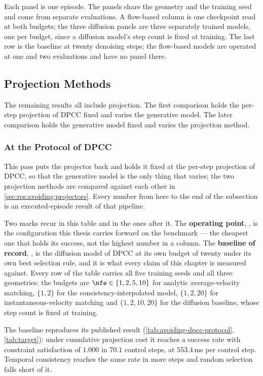 Each panel is one episode. The panels share the geometry and the training seed and come from separate
evaluations. A flow-based column is one checkpoint read at both budgets; the three diffusion panels are
three separately trained models, one per budget, since a diffusion model's step count is fixed at
training. The last row is the baseline at twenty denoising steps; the flow-based models are operated at
one and two evaluations and have no panel there.

\subsection{Projection Methods}\label{sec:res:avoiding:projection}

The remaining results all include projection. The first comparison holds the per-step projection of
\ac{DPCC} fixed and varies the generative model. The later comparison holds the generative model fixed
and varies the projection method.

\subsubsection{At the Protocol of DPCC}\label{sec:res:avoiding:dpccprotocol}\label{sec:res:fewstep}

This pass puts the projector back and holds it fixed at the per-step projection of \ac{DPCC}, so that
the generative model is the only thing that varies; the two projection methods are compared against
each other in \autoref{sec:res:avoiding:projectors}. Every number from here to the end of the
subsection is an executed-episode result of that pipeline.

Two marks recur in this table and in the ones after it. The \textbf{operating point}, \selectedmark, is
the configuration this thesis carries forward on the benchmark --- the cheapest one that holds its
success, not the highest number in a column. The \textbf{baseline of record}, \baselinemark, is the
diffusion model of \ac{DPCC} at its own budget of twenty under its own best selection rule, and it is
what every claim of this chapter is measured against. Every row of the table carries all five training
seeds and all three geometries: the budgets are $\nfe\in\{1,2,5,10\}$ for analytic average-velocity
matching, $\{1,2\}$ for the consistency-interpolated model, $\{1,2,20\}$ for instantaneous-velocity
matching and $\{1,2,10,20\}$ for the diffusion baseline, whose step count is fixed at training.

The baseline reproduces its published result (\autoref{tab:avoiding-dpcc-protocol},
\autoref{tab:target}): under cumulative projection cost it reaches a success rate with constraint
satisfaction of $1.000$ in $70.1$ control steps, at $553.4$\,ms per control step. Temporal consistency
reaches the same rate in more steps and random selection falls short of it.

